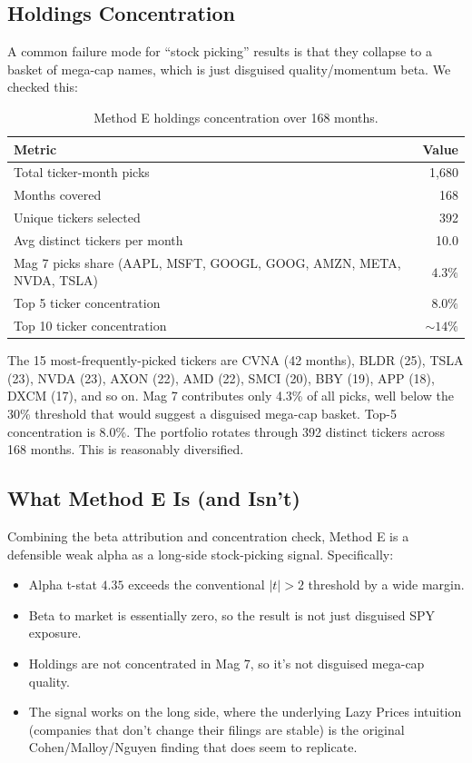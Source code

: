 \documentclass[11pt,a4paper]{article}
\begin{document}
\subsection{Holdings Concentration}

A common failure mode for ``stock picking'' results is that they collapse to a basket of mega-cap names, which is just disguised quality/momentum beta. We checked this:

\begin{table}[H]
\centering
\caption{Method E holdings concentration over 168 months.}
\label{tab:concentration}
\begin{tabular}{lr}
\toprule
Metric & Value \\
\midrule
Total ticker-month picks & 1{,}680 \\
Months covered & 168 \\
Unique tickers selected & 392 \\
Avg distinct tickers per month & 10.0 \\
Mag 7 picks share (AAPL, MSFT, GOOGL, GOOG, AMZN, META, NVDA, TSLA) & $\mathbf{4.3\%}$ \\
Top 5 ticker concentration & $\mathbf{8.0\%}$ \\
Top 10 ticker concentration & $\sim 14\%$ \\
\bottomrule
\end{tabular}
\end{table}

The 15 most-frequently-picked tickers are CVNA (42 months), BLDR (25), TSLA (23), NVDA (23), AXON (22), AMD (22), SMCI (20), BBY (19), APP (18), DXCM (17), and so on. Mag 7 contributes only 4.3\% of all picks, well below the 30\% threshold that would suggest a disguised mega-cap basket. Top-5 concentration is 8.0\%. The portfolio rotates through 392 distinct tickers across 168 months. This is reasonably diversified.

\subsection{What Method E Is (and Isn't)}

Combining the beta attribution and concentration check, Method E is a defensible weak alpha as a long-side stock-picking signal. Specifically:
\begin{itemize}[noitemsep]
    \item Alpha t-stat $4.35$ exceeds the conventional $|t| > 2$ threshold by a wide margin.
    \item Beta to market is essentially zero, so the result is not just disguised SPY exposure.
    \item Holdings are not concentrated in Mag 7, so it's not disguised mega-cap quality.
    \item The signal works on the long side, where the underlying Lazy Prices intuition (companies that don't change their filings are stable) is the original Cohen/Malloy/Nguyen finding that does seem to replicate.
\end{itemize}
\end{document}
